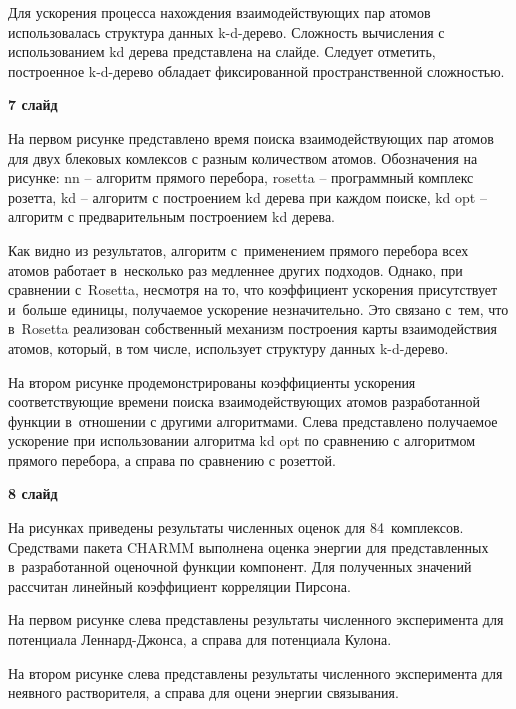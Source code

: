 \documentclass[17pt]{extarticle}
\begin{document}
Для ускорения процесса нахождения взаимодействующих пар атомов использовалась структура данных k-d-дерево. Сложность вычисления с использованием kd дерева представлена на слайде. Следует отметить, построенное k-d-дерево обладает фиксированной пространственной сложностью.

\vspace{+5mm}

\textbf{7 слайд}

На первом рисунке представлено время поиска взаимодействующих пар атомов для двух блековых комлексов с разным количеством атомов.
Обозначения на рисунке: nn -- алгоритм прямого перебора, rosetta -- программный комплекс розетта, kd -- алгоритм с построением kd дерева при каждом поиске, kd opt -- алгоритм с предварительным построением kd дерева.

Как видно из результатов, алгоритм с~применением прямого перебора всех атомов работает в~несколько раз медленнее других подходов. Однако, при сравнении с~Rosetta, несмотря на то, что коэффициент ускорения присутствует и~больше единицы, получаемое ускорение незначительно. Это связано с~тем, что в~Rosetta реализован собственный механизм построения карты взаимодействия атомов, который, в том числе, использует структуру данных k-d-дерево.

На втором рисунке продемонстрированы коэффициенты ускорения соответствующие времени поиска взаимодействующих атомов разработанной функции в~отношении с другими алгоритмами. Слева представлено получаемое ускорение при использовании алгоритма kd opt по сравнению с алгоритмом прямого перебора, а справа по сравнению с розеттой.

\vspace{+5mm}

\textbf{8 слайд}

На рисунках приведены результаты численных оценок для 84~комплексов. Средствами пакета CHARMM выполнена оценка энергии для представленных в~разработанной оценочной функции компонент. Для полученных значений рассчитан линейный коэффициент корреляции Пирсона.

На первом рисунке слева представлены результаты численного эксперимента для потенциала Леннард-Джонса, а справа для потенциала Кулона.

На втором рисунке слева представлены результаты численного эксперимента для неявного растворителя, а справа для оцени энергии связывания.

\vspace{+5mm}
\end{document}
